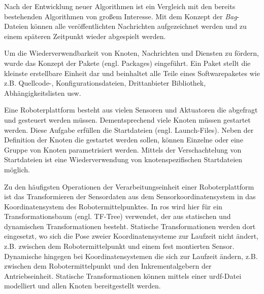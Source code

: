 Nach der Entwicklung neuer Algorithmen ist ein Vergleich mit den bereits bestehenden Algorithmen von großem Interesse. Mit dem Konzept der \textit{Bag}-Dateien können alle veröffentlichten Nachrichten aufgezeichnet werden und zu einem späteren Zeitpunkt wieder abgespielt werden.

Um die Wiederverwendbarkeit von Knoten, Nachrichten und Diensten zu fördern, wurde das Konzept der Pakete (engl. Packages) eingeführt. Ein Paket stellt die kleinste erstellbare Einheit dar und beinhaltet alle Teile eines Softwarepaketes wie z.B. Quellcode-, Konfigurationsdateien, Drittanbieter Bibliothek, Abhängigkeitslisten usw.

Eine Roboterplattform besteht aus vielen Sensoren und Aktuatoren die abgefragt und gesteuert werden müssen. Dementsprechend viele Knoten müssen gestartet werden. Diese Aufgabe erfüllen die Startdateien (engl. Launch-Files). Neben der Definition der Knoten die gestartet werden sollen, können Einzelne oder eine Gruppe von Knoten parametrisiert werden. Mittels der Verschachtelung von Startdateien ist eine Wiederverwendung von knotenspezifischen Startdateien möglich.

Zu den häufigsten Operationen der Verarbeitungseinheit einer Roboterplattform ist das Transformieren der Sensordaten aus dem Sensorkoordinatensystem in das Koordinatensystem des Robotermittelpunktes. In \Gls{ros} wird hier für ein Transformationsbaum (engl. TF-Tree) verwendet, der aus statischen und dynamischen Transformationen besteht. Statische Transformationen werden dort eingesetzt, wo sich die Pose zweier Koordinatensysteme zur Laufzeit nicht ändert, z.B. zwischen dem Robotermittelpunkt und einem fest montierten Sensor. Dynamische hingegen bei Koordinatensystemen die sich zur Laufzeit ändern, z.B. zwischen dem Robotermittelpunkt und den Inkrementalgebern der Antriebseinheit. Statische Transformationen können mittels einer \Gls{urdf}-Datei modelliert und allen Knoten bereitgestellt werden.

